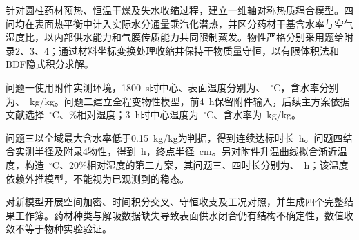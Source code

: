 针对圆柱药材预热、恒温干燥及失水收缩过程，建立一维轴对称热质耦合模型。四问均在表面热平衡中计入实际水分通量乘汽化潜热，并区分药材干基含水率与空气湿度比，以内部供水能力和气膜传质能力共同限制蒸发。物性严格分别采用题给附录2、3、4；通过材料坐标变换处理收缩并保持干物质量守恒，以有限体积法和BDF隐式积分求解。

问题一使用附件实测环境，1800~s时中心、表面温度分别为\QOneCenterT{}、\QOneSurfaceT{}~$^\circ$C，含水率分别为\QOneCenterC{}、\QOneSurfaceC{}~kg/kg。问题二建立全程变物性模型，前4~h保留附件输入，后续主方案依据文献选择\EnvTempC{}~$^\circ$C、\EnvRHPercent{}\%相对湿度；3~h时中心温度为\QTwoCenterT{}~$^\circ$C、含水率为\QTwoCenterC{}~kg/kg。

问题三以全域最大含水率低于0.15~kg/kg为判据，得到连续达标时长\QThreeEndH{}~h。问题四结合实测半径及附录4物性，得到\QFourEndH{}~h，终点半径\QFourEndRadiusCm{}~cm。另对附件升温曲线拟合渐近温度，构造\FitTempC{}~$^\circ$C、20\%相对湿度的第二方案，其问题三、四时长分别为\FitQThreeEndH{}、\FitQFourEndH{}~h；该温度依赖外推模型，不能视为已观测到的稳态。

对新模型开展空间加密、时间积分交叉、守恒收支及工况对照，并生成四个完整结果工作簿。药材种类与解吸数据缺失导致表面供水闭合仍有结构不确定性，数值收敛不等于物种实验验证。

